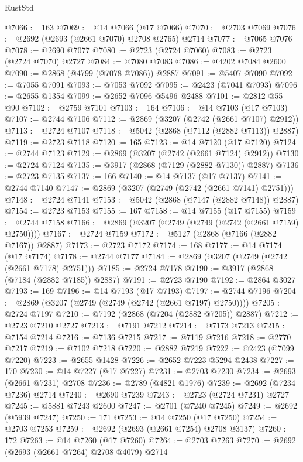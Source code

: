 \begin{lexlean}{RustStd}
\begin{coremodule}
@7066 := 163
@7069 := @14 @7066 (@17 @7066)
@7070 := @2703 @7069
@7076 := @2692 (@2693 (@2661 @7070) @2708 @2765) @2714
@7077 := @7065 @7076
@7078 := @2690 @7077
@7080 := @2723 (@2724 @7060)
@7083 := @2723 (@2724 @7070) @2727
@7084 := @7080 @7083
@7086 := @4202 @7084 @2600
@7090 := @2868 (@4799 (@7078 @7086)) @2887
@7091 := @5407 @7090
@7092 := @7055 @7091
@7093 := @7053 @7092
@7095 := @2423 (@7041 @7093)
@7096 := @2655 @1354
@7099 := @2652 @7096 @5496 @2488
@7101 := @2812 @55 @90
@7102 := @2759 @7101
@7103 := 164
@7106 := @14 @7103 (@17 @7103)
@7107 := @2744 @7106
@7112 := @2869 (@3207 (@2742 (@2661 @7107) @2912))
@7113 := @2724 @7107
@7118 := @5042 (@2868 (@7112 (@2882 @7113)) @2887)
@7119 := @2723 @7118
@7120 := 165
@7123 := @14 @7120 (@17 @7120)
@7124 := @2744 @7123
@7129 := @2869 (@3207 (@2742 (@2661 @7124) @2912))
@7130 := @2724 @7124
@7135 := @3917 (@2868 (@7129 (@2882 @7130)) @2887)
@7136 := @2723 @7135
@7137 := 166
@7140 := @14 @7137 (@17 @7137)
@7141 := @2744 @7140
@7147 := @2869 (@3207 (@2749 (@2742 (@2661 @7141) @2751)))
@7148 := @2724 @7141
@7153 := @5042 (@2868 (@7147 (@2882 @7148)) @2887)
@7154 := @2723 @7153
@7155 := 167
@7158 := @14 @7155 (@17 @7155)
@7159 := @2744 @7158
@7166 := @2869 (@3207 (@2749 (@2749 (@2742 (@2661 @7159) @2750))))
@7167 := @2724 @7159
@7172 := @5127 (@2868 (@7166 (@2882 @7167)) @2887)
@7173 := @2723 @7172
@7174 := 168
@7177 := @14 @7174 (@17 @7174)
@7178 := @2744 @7177
@7184 := @2869 (@3207 (@2749 (@2742 (@2661 @7178) @2751)))
@7185 := @2724 @7178
@7190 := @3917 (@2868 (@7184 (@2882 @7185)) @2887)
@7191 := @2723 @7190
@7192 := @2864 @3027
@7193 := 169
@7196 := @14 @7193 (@17 @7193)
@7197 := @2744 @7196
@7204 := @2869 (@3207 (@2749 (@2749 (@2742 (@2661 @7197) @2750))))
@7205 := @2724 @7197
@7210 := @7192 (@2868 (@7204 (@2882 @7205)) @2887)
@7212 := @2723 @7210 @2727
@7213 := @7191 @7212
@7214 := @7173 @7213
@7215 := @7154 @7214
@7216 := @7136 @7215
@7217 := @7119 @7216
@7218 := @2770 @7217
@7219 := @7102 @7218
@7220 := @2882 @7219
@7222 := @2423 (@7099 @7220)
@7223 := @2655 @1428
@7226 := @2652 @7223 @5294 @2438
@7227 := 170
@7230 := @14 @7227 (@17 @7227)
@7231 := @2703 @7230
@7234 := @2693 (@2661 @7231) @2708
@7236 := @2789 (@4821 @1976)
@7239 := @2692 (@7234 @7236) @2714
@7240 := @2690 @7239
@7243 := @2723 (@2724 @7231) @2727
@7245 := @5881 @7243 @2600
@7247 := @2701 (@7240 @7245)
@7249 := @2692 (@5939 @7247)
@7250 := 171
@7253 := @14 @7250 (@17 @7250)
@7254 := @2703 @7253
@7259 := @2692 (@2693 (@2661 @7254) @2708 @3137)
@7260 := 172
@7263 := @14 @7260 (@17 @7260)
@7264 := @2703 @7263
@7270 := @2692 (@2693 (@2661 @7264) @2708 @4079) @2714

\end{coremodule}
\end{lexlean}
